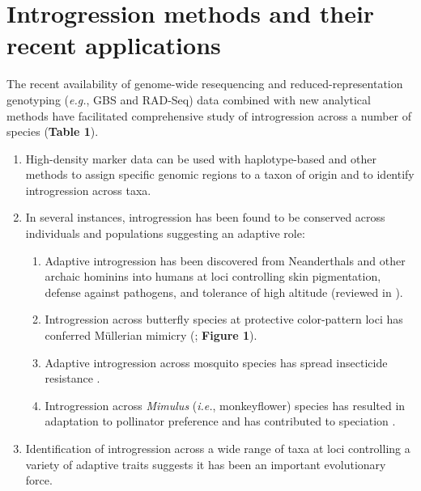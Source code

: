 \documentclass[11pt]{article}
\begin{document}
\section*{Introgression methods and their recent applications}
The recent availability of genome-wide resequencing and reduced-representation genotyping (\emph{e.g.}, GBS and RAD-Seq) data combined with new analytical methods have facilitated comprehensive study of introgression across a number of species (\textbf{Table 1}).
\begin{enumerate}
\item{High-density marker data can be used with haplotype-based and other methods to assign specific genomic regions to a taxon of origin and to identify introgression across taxa.}
\item{In several instances, introgression has been found to be conserved across individuals and populations suggesting an adaptive role:}
	\begin{enumerate}
	\item{Adaptive introgression has been discovered from Neanderthals and other archaic hominins into humans at loci controlling skin pigmentation, defense against pathogens, and tolerance of high altitude (reviewed in \cite{Racimo2015}}).
	\item{Introgression across butterfly species at protective color-pattern loci has conferred M\"{u}llerian mimicry (\cite{Heliconius2012}; \textbf{Figure 1})}.
	\item{Adaptive introgression across mosquito species has spread insecticide resistance \cite{Norris2015}}.
	\item{Introgression across \emph{Mimulus} (\emph{i.e.}, monkeyflower) species has resulted in adaptation to pollinator preference and has contributed to speciation \cite{Stankowski2015}}.
	\end{enumerate}
\item{Identification of introgression across a wide range of taxa at loci controlling a variety of adaptive traits suggests it has been an important evolutionary force.}
\end{enumerate}


\end{document}
